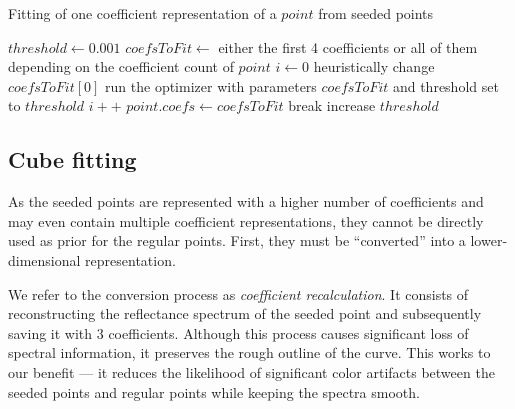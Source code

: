 \begin{algorithm}[t!]
	\caption{Fitting of one coefficient representation of a $point$ from seeded points}
	\label{alg:fittingAtlasLatticePoints}
	\begin{algorithmic}[1]
		\State $threshold \gets 0.001$
		\State $coefsToFit \gets$ either the first 4 coefficients or all of them depending on the coefficient count of $point$
		\State $i \gets 0$
		\State heuristically change $coefsToFit[0]$
		\State run the optimizer with parameters $coefsToFit$ and threshold set to $threshold$
		\State $i++$
		\EndWhile
		\State $point.coefs \gets coefsToFit$
		\State break
		\EndIf
		\State increase $threshold$
		\EndWhile
	\end{algorithmic}
\end{algorithm}

\subsection{Cube fitting} \label{ssec:cubeFitting}

As the seeded points are represented with a higher number of coefficients and may even contain multiple coefficient representations, they cannot be directly used as prior for the regular points. First, they must be ``converted'' into a lower-dimensional representation.

We refer to the conversion process as \emph{coefficient recalculation}. It consists of reconstructing the reflectance spectrum of the seeded point and subsequently saving it with 3 coefficients. Although this process causes significant loss of spectral information, it preserves the rough outline of the curve. This works to our benefit --- it reduces the likelihood of significant color artifacts between the seeded points and regular points while keeping the spectra smooth.

